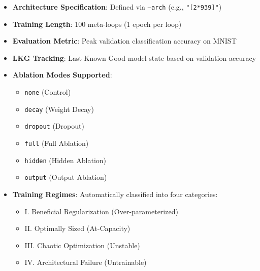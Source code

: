 \documentclass[conference]{IEEEtran}
\begin{document}
\begin{itemize}
  \item \textbf{Architecture Specification}: Defined via \texttt{--arch} (e.g., \texttt{"[2*939]"})
  \item \textbf{Training Length}: 100 meta-loops (1 epoch per loop)
  \item \textbf{Evaluation Metric}: Peak validation classification accuracy on MNIST
  \item \textbf{LKG Tracking}: Last Known Good model state based on validation accuracy
  \item \textbf{Ablation Modes Supported}:
    \begin{itemize}
      \item \texttt{none} (Control)
      \item \texttt{decay} (Weight Decay)
      \item \texttt{dropout} (Dropout)
      \item \texttt{full} (Full Ablation)
      \item \texttt{hidden} (Hidden Ablation)
      \item \texttt{output} (Output Ablation)
    \end{itemize}
  \item \textbf{Training Regimes}: Automatically classified into four categories:
    \begin{itemize}
      \item I. Beneficial Regularization (Over-parameterized)
      \item II. Optimally Sized (At-Capacity)
      \item III. Chaotic Optimization (Unstable)
      \item IV. Architectural Failure (Untrainable)
    \end{itemize}
\end{itemize}
\end{document}
